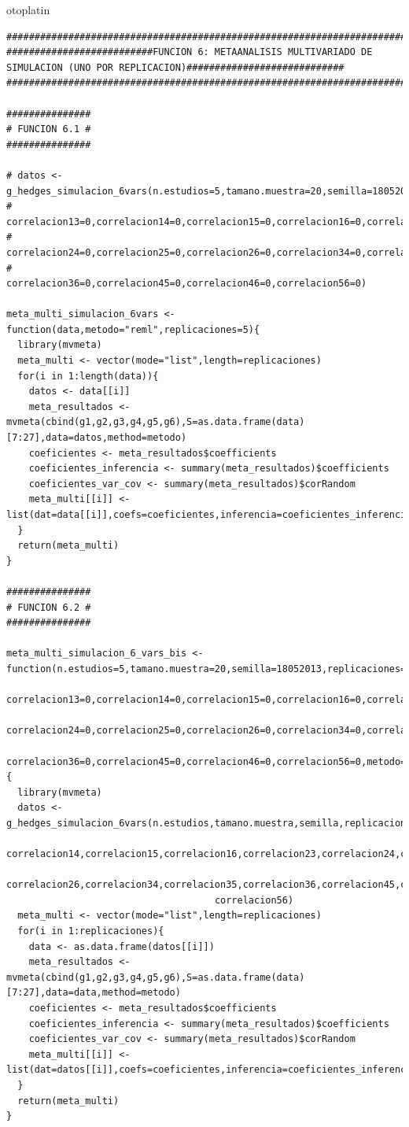otoplatin\documentclass[a4paper,openright,12pt]{report}
\begin{document}
{\begin{verbatim}
##############################################################################################################################
##########################FUNCION 6: METAANALISIS MULTIVARIADO DE SIMULACION (UNO POR REPLICACION)############################
##############################################################################################################################

###############
# FUNCION 6.1 #
###############

# datos <- g_hedges_simulacion_6vars(n.estudios=5,tamano.muestra=20,semilla=18052013,replicaciones=5,correlacion12=0,
#                                    correlacion13=0,correlacion14=0,correlacion15=0,correlacion16=0,correlacion23=0,
#                                    correlacion24=0,correlacion25=0,correlacion26=0,correlacion34=0,correlacion35=0,
#                                    correlacion36=0,correlacion45=0,correlacion46=0,correlacion56=0)

meta_multi_simulacion_6vars <- function(data,metodo="reml",replicaciones=5){
  library(mvmeta)
  meta_multi <- vector(mode="list",length=replicaciones)
  for(i in 1:length(data)){
    datos <- data[[i]]
    meta_resultados <- mvmeta(cbind(g1,g2,g3,g4,g5,g6),S=as.data.frame(data)[7:27],data=datos,method=metodo)
    coeficientes <- meta_resultados$coefficients
    coeficientes_inferencia <- summary(meta_resultados)$coefficients
    coeficientes_var_cov <- summary(meta_resultados)$corRandom
    meta_multi[[i]] <- list(dat=data[[i]],coefs=coeficientes,inferencia=coeficientes_inferencia,var_cov=coeficientes_var_cov)
  }
  return(meta_multi)  
}

###############
# FUNCION 6.2 #
###############

meta_multi_simulacion_6_vars_bis <- function(n.estudios=5,tamano.muestra=20,semilla=18052013,replicaciones=5,correlacion12=0,
                                             correlacion13=0,correlacion14=0,correlacion15=0,correlacion16=0,correlacion23=0,
                                             correlacion24=0,correlacion25=0,correlacion26=0,correlacion34=0,correlacion35=0,
                                             correlacion36=0,correlacion45=0,correlacion46=0,correlacion56=0,metodo="reml"){
  library(mvmeta)
  datos <- g_hedges_simulacion_6vars(n.estudios,tamano.muestra,semilla,replicaciones,correlacion12,correlacion13,
                                     correlacion14,correlacion15,correlacion16,correlacion23,correlacion24,correlacion25,
                                     correlacion26,correlacion34,correlacion35,correlacion36,correlacion45,correlacion46,
                                     correlacion56)
  meta_multi <- vector(mode="list",length=replicaciones)
  for(i in 1:replicaciones){
    data <- as.data.frame(datos[[i]])
    meta_resultados <- mvmeta(cbind(g1,g2,g3,g4,g5,g6),S=as.data.frame(data)[7:27],data=data,method=metodo)
    coeficientes <- meta_resultados$coefficients
    coeficientes_inferencia <- summary(meta_resultados)$coefficients
    coeficientes_var_cov <- summary(meta_resultados)$corRandom
    meta_multi[[i]] <- list(dat=datos[[i]],coefs=coeficientes,inferencia=coeficientes_inferencia,var_cov=coeficientes_var_cov)
  }
  return(meta_multi)  
}
\end{verbatim}}
\end{document}
